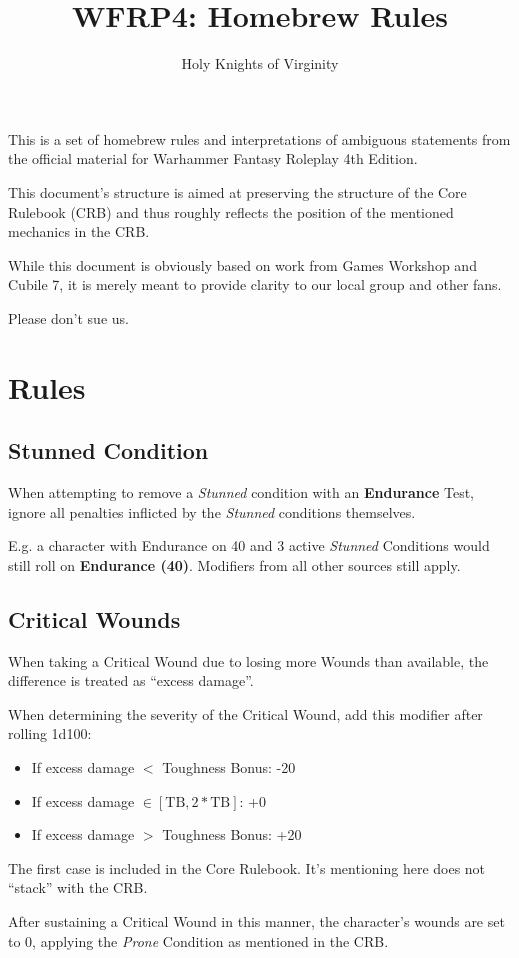 \documentclass[parskip=full,11pt]{wfrp-short}
\title{WFRP4: Homebrew Rules}
\author{Holy Knights of Virginity}
\begin{document}
\maketitle
\thispagestyle{empty} %

\section*{} %
\vspace{5pt}
This is a set of homebrew rules and interpretations of ambiguous statements
from the official material for Warhammer Fantasy Roleplay 4th Edition.

This document's structure is aimed at preserving the structure of the Core
Rulebook (CRB) and thus roughly reflects the position of the mentioned
mechanics in the CRB.

While this document is obviously based on work from Games Workshop and Cubile
7, it is merely meant to provide clarity to our local group and other fans.

Please don't sue us.

\pagebreak
\tableofcontents

\pagebreak
\section{Rules}

\subsection{Stunned Condition}
When attempting to remove a \textit{Stunned} condition with an
\textbf{Endurance} Test, ignore all penalties inflicted by the \textit{Stunned}
conditions themselves.

E.g. a character with Endurance on 40 and 3 active \textit{Stunned} Conditions
would still roll on \textbf{Endurance (40)}.
Modifiers from all other sources still apply.

\subsection{Critical Wounds}
When taking a Critical Wound due to losing more Wounds than available, the
difference is treated as \enquote{excess damage}.

When determining the severity of the Critical Wound, add this modifier after
rolling 1d100:
\begin{itemize}
    \item If excess damage $<$ Toughness Bonus: -20
    \item If excess damage $\in [\text{TB}, 2*\text{TB}]$: +0
    \item If excess damage $>$ Toughness Bonus: +20
\end{itemize}

The first case is included in the Core Rulebook.
It's mentioning here does not \enquote{stack} with the CRB.

After sustaining a Critical Wound in this manner, the character's wounds are
set to 0, applying the \textit{Prone} Condition as mentioned in the CRB.
\end{document}
